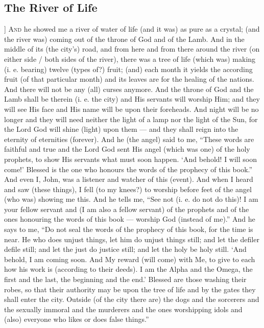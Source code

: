 \begin{pages}
\begin{Leftside}
        			\chapter{The River of Life}
				]		
		\renewcommand{\LettrineFontHook}{\Zallmanfamily}
		\lettrine[lines=3]{A}{nd} he showed me a river of water of life (and it was) as pure as a crystal; (and the river was) coming out of the throne of God and of the Lamb. And in the middle of its (the city’s) road, and from here and from there around the river (on either side / both sides of the river), there was a tree of life (which was) making (i. e. bearing) twelve (types of?) fruit; (and) each month it yields the according fruit (of that particular month) and its leaves are for the healing of the nations. 
		\pend
		\pstart
		And there will not be any (all) curses anymore. And the throne of God and the Lamb shall be therein (i. e. the city) and His servants will worship Him; and they will see His face and His name will be upon their foreheads. And night will be no longer and they will need neither the light of a lamp nor the light of the Sun, for the Lord God will shine (light) upon them — and they shall reign into the eternity of eternities (forever). 
		\pend
		\pstart
		And he (the angel) said to me, “These words are faithful and true and the Lord God sent His angel (which was one) of the holy prophets, to show His servants what must soon happen. ‘And behold! I will soon come!’ Blessed is the one who honours the words of the prophecy of this book.” And even I, John, was a listener and watcher of this (event). And when I heard and saw (these things), I fell (to my knees?) to worship before feet of the angel (who was) showing me this. And he tells me, “See not (i. e. do not do this)! I am your fellow servant and (I am also a fellow servant) of the prophets and of the ones honouring the words of this book — worship God (instead of me).”
		\pend
		\pstart
		And he says to me, “Do not seal the words of the prophecy of this book, for the time is near. He who does unjust things, let him do unjust things still; and let the defiler defile still; and let the just do justice still; and let the holy be holy still. ‘And behold, I am coming soon. And My reward (will come) with Me, to give to each how his work is (according to their deeds). I am the Alpha and the Omega, the first and the last, the beginning and the end.’ Blessed are those washing their robes, so that their authority may be upon the tree of life and by the gates they shall enter the city. Outside (of the city there are) the dogs and the sorcerers and the sexually immoral and the murderers and the ones worshipping idols and (also) everyone who likes or does false things.”

\end{Leftside}
\end{pages}
